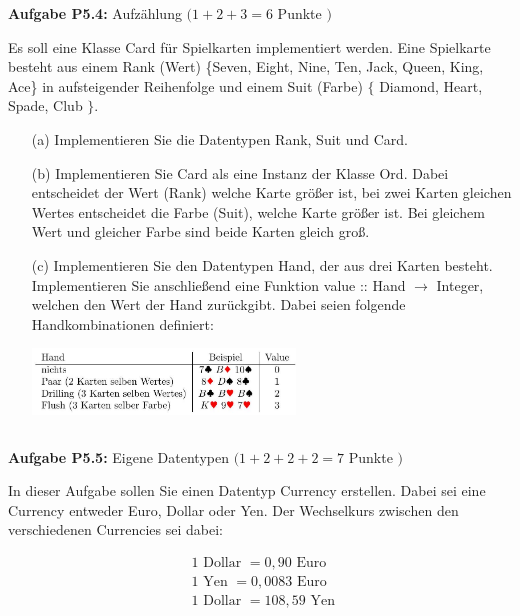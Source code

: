 \newpage

\textbf{Aufgabe P5.4:} Aufzählung $(1+2+3=6$ Punkte $)$

Es soll eine Klasse Card für Spielkarten implementiert werden. Eine Spielkarte besteht aus einem Rank (Wert) \{Seven, Eight, Nine, Ten, Jack, Queen, King, Ace\} in aufsteigender Reihenfolge und einem Suit (Farbe) $\{$ Diamond, Heart, Spade, Club $\}$.


\begin{itemize}
  \item [(a)] Implementieren Sie die Datentypen Rank, Suit und Card.

\item [(b)] Implementieren Sie Card als eine Instanz der Klasse Ord. Dabei entscheidet der Wert (Rank) welche Karte größer ist, bei zwei Karten gleichen Wertes entscheidet die Farbe (Suit), welche Karte größer ist. Bei gleichem Wert und gleicher Farbe sind beide Karten gleich groß. 

\item [(c)] Implementieren Sie den Datentypen Hand, der aus drei Karten besteht. Implementieren Sie anschließend eine Funktion value :: Hand $\rightarrow$ Integer, welchen den Wert der Hand zurückgibt. Dabei seien folgende Handkombinationen definiert:

\centering
\includegraphics[width=7cm]{2022_11_15_0a5a2eee0aef383b0ce9g-3}

\newpage

\inputminted{Haskell}{A5_4.hs}
\end{itemize}

\newpage

\textbf{Aufgabe P5.5:} Eigene Datentypen $(1+2+2+2=7$ Punkte $)$ 

In dieser Aufgabe sollen Sie einen Datentyp Currency erstellen. Dabei sei eine Currency entweder Euro, Dollar oder Yen. Der Wechselkurs zwischen den verschiedenen Currencies sei dabei:

$$
\begin{aligned}
&1 \text { Dollar }=0,90 \text { Euro } \\
&1 \text { Yen }=0,0083 \text { Euro } \\
&1 \text { Dollar }=108,59 \text { Yen }
\end{aligned}
$$

